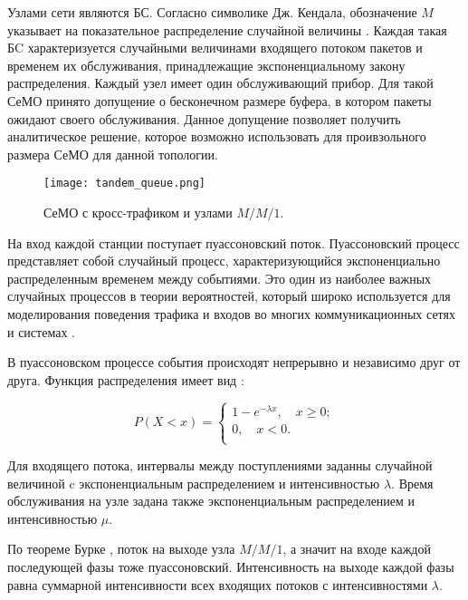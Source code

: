 Узлами сети являются БС. Согласно символике Дж. Кендала, обозначение $M$ указывает на показательное распределение случайной величины \cite{VishnevskyBook, Kleinrock1975}. Каждая такая БC характеризуется случайными величинами входящего потоком пакетов и временем их обслуживания, принадлежащие экспоненциальному закону распределения. Каждый узел имеет один обслуживающий прибор. Для такой СеМО принято допущение о бесконечном размере буфера, в котором пакеты ожидают своего обслуживания. Данное допущение позволяет получить аналитическое решение, которое возможно использовать для проивзольного размера СеМО для данной топологии.

\begin{figure}[h!]
  \centering
   \texttt{[image: tandem\_queue.png]}
\caption{СеМО с кросс-трафиком и узлами $M/M/1$.}
\label{fig:tandem_queue}
\end{figure}

На вход каждой станции поступает пуассоновский поток. Пуассоновский процесс представляет собой случайный процесс, характеризующийся  экспоненциально распределенным временем между событиями. Это один из наиболее важных случайных процессов в теории вероятностей, который широко используется для моделирования поведения трафика и входов во многих коммуникационных сетях и системах \cite{Kalor2018, Gao2016, Malandra2018, Seliem2019}. 

В пуассоновском процессе события происходят непрерывно и независимо друг от друга. Функция распределения имеет вид  \cite{VishnevskyBook, Kleinrock1975}:

\begin{displaymath}
P(X<x) = 
  \begin{cases}
    1 - e^{- \lambda x}, \quad x \geqslant 0; \\
    0, \quad x < 0.\\
  \end{cases}
\end{displaymath}

Для входящего потока, интервалы между поступлениями заданны случайной величиной c экспоненциальным распределением и интенсивностью $\lambda$. Время обслуживания на узле задана также экспоненциальным распределением и интенсивностью $\mu$. 


По теореме Бурке \cite{Burke1956}, поток на выходе узла $M/M/1$, а значит на входе каждой последующей фазы тоже пуассоновский. Интенсивность на выходе каждой фазы равна суммарной интенсивности всех входящих потоков с интенсивностями $\lambda$.

